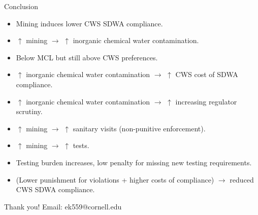 \documentclass{beamer}
\begin{document}
\begin{frame}{Conclusion}
\begin{itemize}
    \item Mining induces lower CWS SDWA compliance.
    \item $\uparrow$ mining $\rightarrow$   $\uparrow$ inorganic chemical water contamination.
    \item Below MCL but still above CWS preferences.
    \item $\uparrow$ inorganic chemical water contamination $\rightarrow$ $\uparrow$ CWS cost of SDWA compliance.
    \item $\uparrow$ inorganic chemical water contamination $\rightarrow$ $\uparrow$ increasing regulator scrutiny.    
    \item $\uparrow$ mining $\rightarrow$ $\uparrow$ sanitary visits (non-punitive enforcement).
    \item $\uparrow$ mining $\rightarrow$ $\uparrow$ tests.
    \item Testing burden increases, low penalty for missing new testing requirements.
    \item (Lower punishment for violations + higher costs of compliance) $\rightarrow$ reduced CWS SDWA compliance.
\end{itemize}
\end{frame}

\begin{frame}{Thank you!}
    Email: ek559@cornell.edu
\end{frame}
\end{document}
